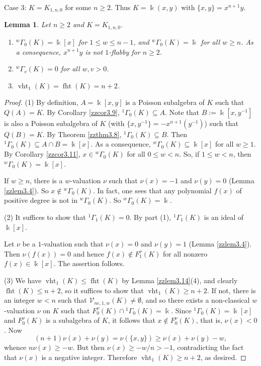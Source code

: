 \documentclass[12pt]{amsart}
\theoremstyle{plain}
\newtheorem{lemma}[theorem]{Lemma}
\numberwithin{theorem}{section}
\numberwithin{equation}{theorem}
\theoremstyle{definition}
\DeclareMathOperator{\fht}{fht}
\DeclareMathOperator{\vht}{vht}
\newcommand \calV {{\mathcal{V}}}
\begin{document}
Case 3: $K = K_{1,n,0}$ for some $n\geq 2$. Thus $K = \Bbbk(x,y)$ with $\{x,y\} = x^{n+1} y$.

\begin{lemma}
\label{zzlem4.5}
Let $n\geq 2$ and $K =K_{1,n,0}$. 
\begin{enumerate}
\item[(1)]
${^{w}\Gamma_{0}}(K)=\Bbbk[x]$ for $1\leq w\leq n-1$, and
${^{w}\Gamma_{0}}(K)=\Bbbk$ for all $w\geq n$. As a consequence, 
$x^{n+1}y$ is not $1$-flabby for $n\geq 2$.
\item[(2)]
${^{w}\Gamma_{v}}(K)=0$ for all $w,v>0$.
\item[(3)]
$\vht_1(K)=\fht(K)=n+2$.
\end{enumerate}
\end{lemma}

\begin{proof}
(1) By definition, $A=\Bbbk[x,y]$ is a Poisson subalgebra 
of $K$ such that $Q(A)=K$. By 
Corollary \ref{zzcor3.9}, ${^{1}\Gamma_{0}}(K)\subseteq A$.  Note that 
$B:=\Bbbk[x,y^{-1}]$ is also
a Poisson subalgebra of $K$ (with 
$\{x,y^{-1}\}=-x^{n+1}(y^{-1})$) 
such that $Q(B)=K$. By Theorem
\ref{zzthm3.8}, ${^{1}\Gamma_{0}}(K)\subseteq B$. Then 
${^{1}\Gamma_{0}}(K)\subseteq A\cap B=\Bbbk[x]$. 
As a consequence, ${^{w}\Gamma_{0}}(K)\subseteq \Bbbk[x]$
for all $w\geq 1$. By Corollary \ref{zzcor3.11},
$x\in {^{w}\Gamma_{0}}(K)$ for all $0 \le w<n$. So, 
if $1\leq w<n$, then ${^{w}\Gamma_{0}}(K)=\Bbbk[x]$. 

If $w\geq n$, there is a $w$-valuation $\nu$ such that
$\nu(x)=-1$ and $\nu(y)=0$ (Lemma \ref{zzlem3.4}). So $x\not\in 
{^{w}\Gamma_{0}}(K)$. In fact, one sees that
any polynomial $f(x)$ of positive degree is not
in ${^{w}\Gamma_{0}}(K)$. So ${^{w}\Gamma_{0}}(K)=\Bbbk$. 

(2) It suffices to show that ${^{1}\Gamma_{1}}(K)=0$. By part (1), 
${^{1}\Gamma_{1}}(K)$ is an ideal of $\Bbbk[x]$.

Let $\nu$ be a $1$-valuation such that $\nu(x)=0$ 
and $\nu(y)=1$ (Lemma \ref{zzlem3.4}). Then $\nu(f(x)) = 0$ and hence 
$f(x)\not\in F^{\nu}_1(K)$ for all nonzero $f(x) \in \Bbbk[x]$.
The assertion follows.

(3) We have $\vht_1(K) \le \fht(K)$ by Lemma \ref{zzlem3.14}(4), and clearly $\fht(K) \le n+2$, so it suffices to show that $\vht_1(K) \ge n+2$.  If not, there is an integer $w < n$ such that $\calV_{nc,1,w}(K) \ne \emptyset$, and so there exists a non-classical $w$-valuation $\nu$ on $K$ such that $F^\nu_0(K) \cap {^{1}\Gamma_0}(K) = \Bbbk$.  Since ${^{1}\Gamma_0}(K) = \Bbbk[x]$ and $F^\nu_0(K)$ is a subalgebra of $K$, it follows that $x \notin F^\nu_0(K)$, that is, $\nu(x) < 0$.  Now
$$
(n+1)\nu(x) + \nu(y) = \nu(\{x,y\}) \ge \nu(x) + \nu(y) - w,
$$
whence $n \nu(x) \ge - w$.  But then $\nu(x) \ge - w / n > -1$, contradicting the fact that $\nu(x)$ is a negative integer.  Therefore $\vht_1(K) \ge n+2$, as desired.
\end{proof}
\end{document}
